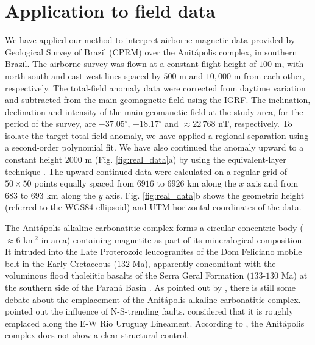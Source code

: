 \section{Application to field data}

We have applied our method to interpret airborne magnetic data provided by 
Geological Survey of Brazil (CPRM) over the Anit{\'a}polis complex, 
in southern Brazil. 
The airborne survey was flown at a constant flight height of $100$ m, 
with north-south and east-west lines spaced by $500$ m and $10,000$ m from each other, respectively. 
The total-field anomaly data were corrected from daytime variation and 
subtracted from the main geomagnetic field using the IGRF. 
The inclination, declination and intensity of the main geomanetic field at the study area, 
for the period of the survey, are $-37.05^{\circ}$, $-18.17^{\circ}$ and 
$\approx 22 \, 768 $ nT, respectively.
To isolate the target total-field anomaly, we have applied 
a regional separation using a second-order polynomial fit. We have also continued 
the anomaly upward to a constant height $2000$ m (Fig. \ref{fig:real_data}a) by 
using the equivalent-layer technique \citep{dampney1969,emilia1973,oliveira-2012}. 
The upward-continued data were calculated on a regular grid of $50 \times 50$ points 
equally spaced from $6916$ to $6926$ km along the $x$ axis and from 
$683$ to $693$ km along the $y$ axis. 
Fig. \ref{fig:real_data}b shows the geometric height (referred to the WGS84 ellipsoid) 
and UTM horizontal coordinates of the data.

The Anit{\'a}polis alkaline-carbonatitic complex forms a circular concentric body 
($\approx 6$ km$^{2}$ in area) containing magnetite as part of its mineralogical 
composition. It intruded into the Late Proterozoic leucogranites of the Dom Feliciano 
mobile belt in the Early Cretaceous ($132$ Ma), apparently concomitant with the 
voluminous flood tholeiitic basalts of the Serra Geral Formation ($133$-$130$ Ma) 
at the southern side of the Paran{\'a} Basin \citep{gibson-1999, scheibe-etal2005}.
As pointed out by \citet{GOMES2018}, there is still some debate about the emplacement 
of the Anit{\'a}polis alkaline-carbonatitic complex. 
\citet{melcher-coutinho1966} pointed out the influence of N-S-trending faults. 
\citet{scheibe-etal2005} considered that it is roughly emplaced along the E-W Rio 
Uruguay Lineament. According to \citet{riccomini-etal2005}, the Anit{\'a}polis 
complex does not show a clear structural control. 

